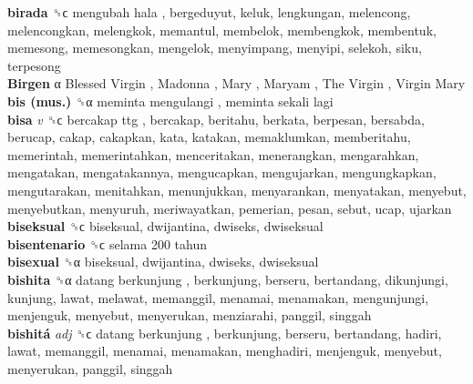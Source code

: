 \textbf{birada} ␝ϲ   mengubah hala , bergeduyut, keluk, lengkungan, melencong, melencongkan, melengkok, memantul, membelok, membengkok, membentuk, memesong, memesongkan, mengelok, menyimpang, menyipi, selekoh, siku, terpesong  \\
\textbf{Birgen} α   Blessed Virgin ,  Madonna ,  Mary ,  Maryam ,  The Virgin ,  Virgin Mary   \\
\textbf{bis (mus.)} ␝α   meminta mengulangi ,  meminta sekali lagi   \\
\textbf{bisa} \emph{v}  ␝ϲ   bercakap ttg , bercakap, beritahu, berkata, berpesan, bersabda, berucap, cakap, cakapkan, kata, katakan, memaklumkan, memberitahu, memerintah, memerintahkan, menceritakan, menerangkan, mengarahkan, mengatakan, mengatakannya, mengucapkan, mengujarkan, mengungkapkan, mengutarakan, menitahkan, menunjukkan, menyarankan, menyatakan, menyebut, menyebutkan, menyuruh, meriwayatkan, pemerian, pesan, sebut, ucap, ujarkan  \\
\textbf{biseksual} ␝ϲ  biseksual, dwijantina, dwiseks, dwiseksual  \\
\textbf{bisentenario} ␝ϲ   selama 200 tahun   \\
\textbf{bisexual} ␝α  biseksual, dwijantina, dwiseks, dwiseksual  \\
\textbf{bishita} ␝α   datang berkunjung , berkunjung, berseru, bertandang, dikunjungi, kunjung, lawat, melawat, memanggil, menamai, menamakan, mengunjungi, menjenguk, menyebut, menyerukan, menziarahi, panggil, singgah  \\
\textbf{bishitá} \emph{adj}  ␝ϲ   datang berkunjung , berkunjung, berseru, bertandang, hadiri, lawat, memanggil, menamai, menamakan, menghadiri, menjenguk, menyebut, menyerukan, panggil, singgah  \\
